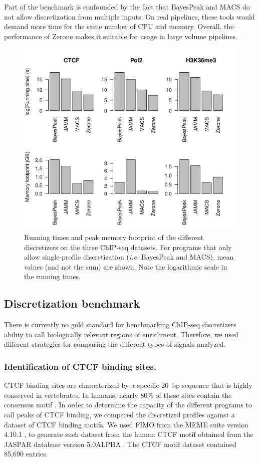 \documentclass{bioinfo}
\begin{document}
Part of the benchmark is confounded by the fact that BayesPeak and MACS do
not allow discretization from multiple inputs. On real pipelines, these tools
would demand more time for the same number of CPU and memory. Overall, the
performance of Zerone makes it suitable for usage in large volume pipelines.

\begin{figure}[!tpb]
\centerline{\includegraphics[scale=0.5]{performance.pdf}}
\caption{Running times and peak memory footprint of the different discretizers
on the three ChIP-seq datasets. For programs that only allow single-profile
discretization (\textit{i.e.} BayesPeak and MACS), mean values (and not the
sum) are shown. Note the logarithmic scale in the running times.
}\label{fig:perf}
\end{figure}

\subsection{Discretization benchmark}
There is currently no gold standard for benchmarking ChIP-seq discretizers
ability to call biologically relevant regions of enrichment. Therefore, we used
different strategies for comparing the different types of signals analyzed.

\subsubsection{Identification of CTCF binding sites.}
CTCF binding sites are characterized by a specific 20~bp sequence that is
highly conserved in vertebrates. In humans, nearly 80\% of these sites contain
the consensus motif \citep{pmid17382889}.
In order to determine the capacity of the different programs to call peaks of
CTCF binding, we compared the discretized profiles against a dataset of CTCF
binding motifs. We used FIMO \citep{pmid21330290} from the MEME suite version
4.10.1 \citep{pmid19458158}, to generate such dataset from the human CTCF motif
obtained from the JASPAR database version 5.0{\textunderscore}ALPHA
\citep{pmid24194598}. The CTCF motif dataset contained 85,690 entries.
\end{document}
